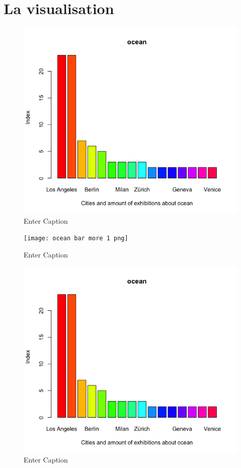 \documentclass[a4paper, twoside, 12pt]{book}
\begin{document}
\chapter{La visualisation}
\begin{figure}
    \centering
    \includegraphics[width=1\linewidth]{ocean bar more than 1.png}
    \caption{Enter Caption}
    \label{fig:enter-label}
\end{figure}
\begin{figure}
    \centering
    \texttt{[image: ocean bar more 1 png]}
    \caption{Enter Caption}
    \label{fig:enter-label}
\end{figure}
\begin{figure}
    \centering
    \includegraphics[width=0.5\linewidth]{ocean bar more than 2..png}
    \caption{Enter Caption}
    \label{fig:enter-label}
\end{figure}
\end{document}
